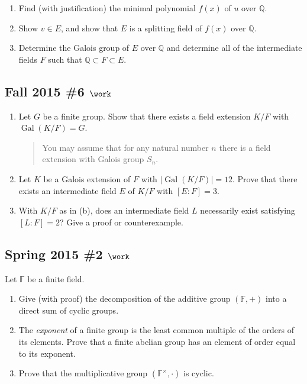 \begin{enumerate}
\def\labelenumi{\alph{enumi}.}
\item
  Find (with justification) the minimal polynomial \(f(x)\) of \(u\)
  over \({\mathbb{Q}}\).
\item
  Show \(v\in E\), and show that \(E\) is a splitting field of \(f(x)\)
  over \({\mathbb{Q}}\).
\item
  Determine the Galois group of \(E\) over \({\mathbb{Q}}\) and
  determine all of the intermediate fields \(F\) such that
  \({\mathbb{Q}}\subset F \subset E\).
\end{enumerate}

\hypertarget{fall-2015-6-work}{%
\subsection{\texorpdfstring{Fall 2015 \#6
\(\work\)}{Fall 2015 \#6 \textbackslash work}}\label{fall-2015-6-work}}

\begin{enumerate}
\def\labelenumi{\alph{enumi}.}
\item
  Let \(G\) be a finite group. Show that there exists a field extension
  \(K/F\) with \(\operatorname{Gal}(K/F) = G\).

  \begin{quote}
  You may assume that for any natural number \(n\) there is a field
  extension with Galois group \(S_n\).
  \end{quote}
\item
  Let \(K\) be a Galois extension of \(F\) with
  \({\left\lvert {\operatorname{Gal}(K/F)} \right\rvert} = 12\). Prove
  that there exists an intermediate field \(E\) of \(K/F\) with
  \([E: F] = 3\).
\item
  With \(K/F\) as in (b), does an intermediate field \(L\) necessarily
  exist satisfying \([L: F] = 2\)? Give a proof or counterexample.
\end{enumerate}

\hypertarget{spring-2015-2-work}{%
\subsection{\texorpdfstring{Spring 2015 \#2
\(\work\)}{Spring 2015 \#2 \textbackslash work}}\label{spring-2015-2-work}}

Let \({\mathbb{F}}\) be a finite field.

\begin{enumerate}
\def\labelenumi{\alph{enumi}.}
\item
  Give (with proof) the decomposition of the additive group
  \(({\mathbb{F}}, +)\) into a direct sum of cyclic groups.
\item
  The \emph{exponent} of a finite group is the least common multiple of
  the orders of its elements. Prove that a finite abelian group has an
  element of order equal to its exponent.
\item
  Prove that the multiplicative group \(({\mathbb{F}}^{\times}, \cdot)\)
  is cyclic.
\end{enumerate}

